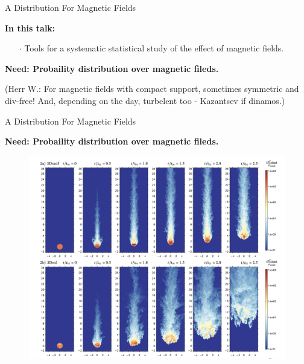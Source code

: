 \documentclass{beamer}
\begin{document}
\begin{frame}{A Distribution For Magnetic Fields}

  \textbf{In this talk:}
  \begin{itemize}
    \setlength\itemsep{1em}
    \item[$\cdot$] Tools for a systematic statistical study of the effect of magnetic fields.
  \end{itemize}

  \vspace{1em}
  \textbf{Need: Probaility distribution over magnetic fileds.}

  (Herr W.: For magnetic fields with compact support, sometimes symmetric and div-free! And, depending on the day, turbelent too - Kazantsev if dinamos.)

\end{frame}


\begin{frame}{A Distribution For Magnetic Fields}

  \textbf{Need: Probaility distribution over magnetic fileds.}

  \begin{figure}
    \includegraphics[width=0.85\linewidth]{plots/sample.png}
  \end{figure}

\end{frame}
\end{document}
